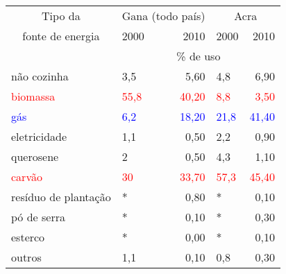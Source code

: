 \begin{tabular}{llrlr}
  \hline
  \multicolumn{1}{c}{Tipo da} & \multicolumn{2}{c}{Gana (todo país)} & \multicolumn{2}{c}{Acra}                                                           \\
  \multicolumn{1}{c}{fonte de energia} & 2000 & 2010 &  2000 & 2010  \\ 
 \hline & \multicolumn{4}{c}{\% de uso} \\ 
  \hline
  não cozinha           & 3,5 & 5,60 & 4,8 & 6,90 \\ 
\textcolor{red}{biomassa}              & \textcolor{red}{55,8} & \textcolor{red}{40,20} & \textcolor{red}{8,8} & \textcolor{red}{3,50} \\ 
\textcolor{blue}{gás}& \textcolor{blue}{6,2} & \textcolor{blue}{18,20} & \textcolor{blue}{21,8} & \textcolor{blue}{41,40} \\ 
  eletricidade          & 1,1 & 0,50 & 2,2 & 0,90 \\ 
  querosene             & 2 & 0,50 & 4,3 & 1,10 \\ 
 \textcolor{red}{carvão} & \textcolor{red}{30} & \textcolor{red}{33,70} & \textcolor{red}{57,3} & \textcolor{red}{45,40} \\ 
  resíduo de plantação  & * & 0,80 & * & 0,10 \\ 
  pó de serra           & * & 0,10 & * & 0,30 \\ 
  esterco               & * & 0,00 & * & 0,10 \\ 
  outros                & 1,1 & 0,10 & 0,8 & 0,30 \\ 
  \hline
\end{tabular}

